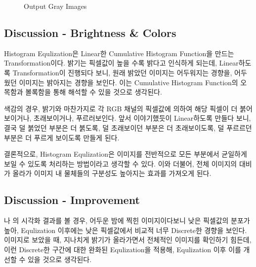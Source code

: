 \documentclass{report}
\begin{document}
\begin{figure}[htbp]
    \medskip

    \hspace{1pt}

    \caption{Output Gray Images}
\end{figure}

\subsection*{Discussion - Brightness \& Colors}

Histogram Equlization은 Linear한 Cumulative Histogram Function을 만드는 Transformation이다.
밝기는 픽셀값이 높을 수록 밝다고 인식하게 되는데, Linear하도록 Transformation이 진행되다 보니, 원래 밝았던 이미지는 어두워지는 경향을, 어두웠던 이미지는 밝아지는 경향을 보인다.
이는 Cumulative Histogram Function의 오목함과 볼록함을 통해 해석할 수 있을 것으로 생각된다.

색감의 경우, 밝기와 마찬가지로 각 RGB 채널의 픽셀값에 의하여 해당 픽셀이 더 붉어보이거나, 초래보이거나, 푸르러보인다.
앞서 이야기했듯이 Linear하도록 만들다 보니, 결국 덜 붉었던 부분은 더 붉도록, 덜 초래보이던 부분은 더 초래보이도록, 덜 푸르르던 부분은 더 푸르게 보이도록 만들게 된다.

결론적으로, Histogram Equlization은 이미지를 전반적으로 모든 부분에서 균일하게 보일 수 있도록 처리하는 방법이라고 생각할 수 있다.
이와 더불어, 전체 이미지의 대비가 올라가 이미지 내 물체들의 구분성도 높아지는 효과를 가져오게 된다.

\subsection*{Discussion - Improvement}

나 의 시각화 결과를 볼 경우, 어두운 밤에 찍힌 이미지이다보니 낮은 픽셀값의 분포가 높아, Equlization 이후에는 낮은 픽셀값에서 비교적 너무 Discrete한 경향을 보인다.
이미지로 보았을 때, 지나치게 밝기가 올라가면서 전체적인 이미지를 확인하기 힘든데, 이런 Discrete한 구간에 대한 완화된 Equlization을 적용해, Equlization 이후 이를 개선할 수 있을 것으로 생각된다.
\end{document}
